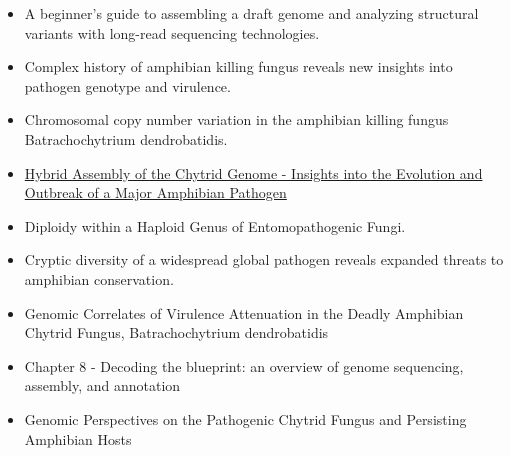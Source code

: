 \documentclass{article}
\begin{document}
    \begin{itemize}
        \item A beginner’s guide to assembling a draft genome and analyzing structural variants with long-read sequencing technologies. \cite{kimBeginnersGuideAssembling2022}

        \item Complex history of amphibian killing fungus reveals new insights into pathogen genotype and virulence. \cite{rosenblumComplexHistoryAmphibiankilling2013}

        \item Chromosomal copy number variation in the amphibian killing fungus Batrachochytrium dendrobatidis. \cite{muletz-wolzDiverseGenotypesAmphibiankilling2019}

        \item \href{https://ourarchive.otago.ac.nz/esploro/outputs/graduate/Hybrid-Assembly-of-the-Chytrid-Genome/9926479564601891#file-0}{Hybrid Assembly of the Chytrid Genome - Insights into the Evolution and Outbreak of a Major Amphibian Pathogen}

        \item Diploidy within a Haploid Genus of Entomopathogenic Fungi. \cite{nielsenDiploidyHaploidGenus2021}

        \item Cryptic diversity of a widespread global pathogen reveals expanded threats to amphibian conservation. \cite{byrneCrypticDiversityWidespread2019}
        
        \item Genomic Correlates of Virulence Attenuation in the Deadly Amphibian Chytrid Fungus, Batrachochytrium dendrobatidis \cite{refsniderGenomicCorrelatesVirulence2015}
        
        \item Chapter 8 - Decoding the blueprint: an overview of genome sequencing, assembly, and annotation \cite{DecodingBlueprintOverview2025}
        
        \item Genomic Perspectives on the Pathogenic Chytrid Fungus and Persisting Amphibian Hosts \cite{byrneGenomicPerspectivesPathogenic2020}
        

    \end{itemize}






    \newpage
\end{document}
